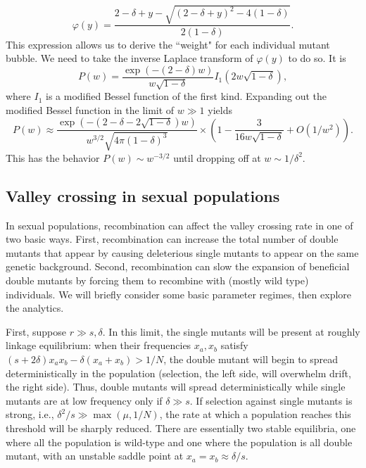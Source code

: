 \documentclass[10pt]{revtex4}
\begin{document}
\begin{equation}
\varphi(y) = \frac{2-\delta+y-\sqrt{(2-\delta+y)^2 - 4(1-\delta)}}{2(1-\delta)}.
\end{equation}
This expression allows us to derive the ``weight" for each individual mutant bubble.
We need to take the inverse Laplace transform of $\varphi (y)$ to do so.
It is
\begin{equation}
P(w) = \frac{\exp(-(2-\delta)w)}{w\sqrt{1-\delta}}I_1(2w\sqrt{1-\delta}),
\end{equation}
where $I_1$ is a modified Bessel function of the first kind.
Expanding out the modified Bessel function in the limit of $w \gg 1$ yields
\begin{equation}
P(w) \approx \frac{\exp(-(2-\delta-2\sqrt{1-\delta})w)}{w^{3/2}\sqrt{4\pi(1-\delta)^3}} \times (1-\frac{3}{16w\sqrt{1-\delta}} + O(1/w^2)).
\end{equation}
This has the behavior $P(w) \sim w^{-3/2}$ until dropping off at $w \sim 1/\delta^2$.

\subsection{Valley crossing in sexual populations}

In sexual populations, recombination can affect the valley crossing rate in one of two basic ways.
First, recombination can increase the total number of double mutants that appear by causing deleterious single mutants to appear on the same genetic background.
Second, recombination can slow the expansion of beneficial double mutants by forcing them to recombine with (mostly wild type) individuals.
We will briefly consider some basic parameter regimes, then explore the analytics.

First, suppose $r \gg s, \delta$.
In this limit, the single mutants will be present at roughly linkage equilibrium: when their frequencies $x_a, x_b$ satisfy $(s+2\delta)x_ax_b - \delta(x_a+x_b) > 1/N$, the double mutant will begin to spread deterministically in the population (selection, the left side, will overwhelm drift, the right side).
Thus, double mutants will spread deterministically while single mutants are at low frequency only if $\delta \gg s$.
If selection against single mutants is strong, i.e., $\delta^2/s \gg \max (\mu, 1/N)$, the rate at which a population reaches this threshold will be sharply reduced.
There are essentially two stable equilibria, one where all the population is wild-type and one where the population is all double mutant, with an unstable saddle point at $x_a = x_b \approx \delta/s$.
\end{document}

